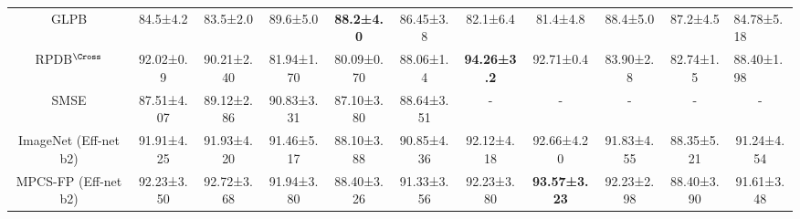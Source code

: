 \documentclass[conference]{IEEEtran}
\begin{document}
\begin{table*}[ht]
\begin{adjustbox}{max width=\textwidth}
\begin{tabular}{c|cccc|c|cccc|c}
GLPB\cite{ataky2020data}                   & \multicolumn{1}{c|}{84.5±4.2}            & \multicolumn{1}{c|}{83.5±2.0}                                    & \multicolumn{1}{c|}{89.6±5.0}                                   & \textbf{88.2±4.0}                          & 86.45±3.8              & \multicolumn{1}{c|}{82.1±6.4}            & \multicolumn{1}{c|}{81.4±4.8}            & \multicolumn{1}{c|}{88.4±5.0}            & 87.2±4.5            & \multicolumn{1}{l}{{\color[HTML]{444444} 84.78±5.18}} \\
RPDB\cite{man2020classification}$^\Cross$  & \multicolumn{1}{c|}{92.02±0.9}           & \multicolumn{1}{c|}{90.21±2.40}                                  & \multicolumn{1}{c|}{81.94±1.70}                                 & 80.09±0.70                                 & 88.06±1.4              & \multicolumn{1}{c|}{\textbf{94.26±3.2}}  & \multicolumn{1}{c|}{92.71±0.4}           & \multicolumn{1}{c|}{83.90±2.8}           & 82.74±1.5           & \multicolumn{1}{l}{{\color[HTML]{444444} 88.40±1.98}} \\
SMSE\cite{sun2021magnificationindependent} & \multicolumn{1}{c|}{87.51±4.07}          & \multicolumn{1}{c|}{89.12±2.86}                                  & \multicolumn{1}{c|}{90.83±3.31}                                 & 87.10±3.80                                 & 88.64±3.51             & \multicolumn{1}{c|}{-}                   & \multicolumn{1}{c|}{-}                   & \multicolumn{1}{c|}{-}                   & -                   & -                                                     \\ \hline
ImageNet (Eff-net b2)                                       & \multicolumn{1}{c|}{91.91±4.25}          & \multicolumn{1}{c|}{91.93±4.20}                                  & \multicolumn{1}{c|}{91.46±5.17}                                 & 88.10±3.88                                 & 90.85±4.36             & \multicolumn{1}{c|}{92.12±4.18}          & \multicolumn{1}{c|}{92.66±4.20}          & \multicolumn{1}{c|}{91.83±4.55}          & 88.35±5.21          & 91.24±4.54                                            \\
MPCS-FP (Eff-net b2)                                        & \multicolumn{1}{c|}{92.23±3.50}          & \multicolumn{1}{c|}{92.72±3.68}                                  & \multicolumn{1}{c|}{91.94±3.80}                                 & 88.40±3.26                                 & 91.33±3.56             & \multicolumn{1}{c|}{92.23±3.80}          & \multicolumn{1}{c|}{\textbf{93.57±3.23}} & \multicolumn{1}{c|}{92.23±2.98}          & 88.40±3.90          & 91.61±3.48                                            \\

\end{tabular}
\end{adjustbox}
\end{table*}
\end{document}
